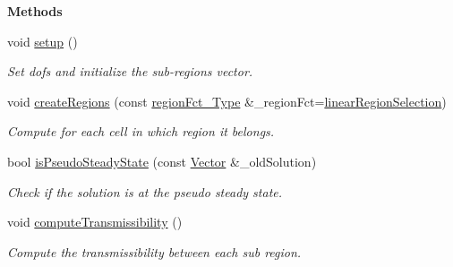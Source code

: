 \begin{Indent}{\bf Methods}\par
\begin{DoxyCompactItemize}
\item 
void \hyperlink{classFVCode3D_1_1MSR_aea841370ef1133a635c885714670abec}{setup} ()
\begin{DoxyCompactList}\small\item\em Set dofs and initialize the sub-\/regions vector. \end{DoxyCompactList}\item 
void \hyperlink{classFVCode3D_1_1MSR_af28b461584648e7d01bc515944ff42e8}{create\+Regions} (const \hyperlink{classFVCode3D_1_1MSR_aebe9d4e9bbcc367d79b0aae7b794c5a6}{region\+Fct\+\_\+\+Type} \&\+\_\+region\+Fct=\hyperlink{namespaceFVCode3D_ae0b3b38fc8dff58445ba3d625deae285}{linear\+Region\+Selection})
\begin{DoxyCompactList}\small\item\em Compute for each cell in which region it belongs. \end{DoxyCompactList}\item 
bool \hyperlink{classFVCode3D_1_1MSR_ae05006ec34d2e773279b4a3028e08d21}{is\+Pseudo\+Steady\+State} (const \hyperlink{namespaceFVCode3D_a16ccf345652402bccd1a5d2e6782526c}{Vector} \&\+\_\+old\+Solution)
\begin{DoxyCompactList}\small\item\em Check if the solution is at the pseudo steady state. \end{DoxyCompactList}\item 
void \hyperlink{classFVCode3D_1_1MSR_a86a998e349b36dbbef9300b15653afc2}{compute\+Transmissibility} ()
\begin{DoxyCompactList}\small\item\em Compute the transmissibility between each sub region. \end{DoxyCompactList}\end{DoxyCompactItemize}
\end{Indent}
